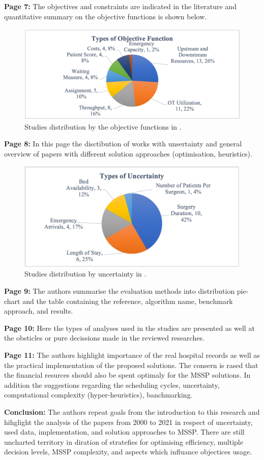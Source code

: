     \textbf{Page 7:}
    The objectives and constraints are indicated in the literature and quantitative summary on the objective functions is shown below.
    \begin{figure}[H]
        \centering
        \includegraphics[width=.8\textwidth]{figures/SR0007MY22/fig4.png}
        \caption{Studies distribution by the objective functions in \cite{x236}.}
        \label{fig4:SR0007MY22}
    \end{figure}

    \textbf{Page 8:}
    In this page the disctibution of works with unsertainty and general overview of papers with different solution approaches (optimisation, heuristics).
    \begin{figure}[H]
        \centering
        \includegraphics[width=.8\textwidth]{figures/SR0007MY22/fig5.png}
        \caption{Studies distribution by uncertainty in \cite{x236}.}
        \label{fig5:SR0007MY22}
    \end{figure}

    \textbf{Page 9:}
    The authors summarise the evaluation methods into distribution pie-chart and the table containing the reference, algorithm name, benchmark approach, and results.
    
    \textbf{Page 10:}
    Here the types of analyses used in the studies are presented as well at the obsticles or pure decissions made in the reviewed researches.
    
    \textbf{Page 11:}
    The authors highlight importance of the real hospital records as well as the practical implementation of the proposed solutions. The consern is rased that the financial resurces should also be spent optimaly for the MSSP solutions. In addition the suggestions regarding the scheduling cycles, uncertainty, computational complexity (hyper-heuristics), banchmarking.
    
    \textbf{Conclusion:}
    The authors repeat goals from the introduction to this research and hihglight the analysis of the papers from 2000 to 2021 in respect of uncertainty, used data, implementation, and solution approaches to MSSP. There are still uncharted territory in diration of stratefies for optimising efficiency, multiple decision levels, MSSP complexity, and aspects which influance objectices usage.